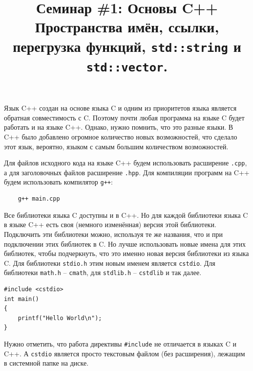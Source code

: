 \documentclass{article}
\begin{document}


\title{Семинар \#1: Основы C++ \\[1ex] \large Пространства имён, ссылки, перегрузка функций, \texttt{std::string} и \texttt{std::vector}. \vspace{-5ex}}\date{}\maketitle

Язык C++ создан на основе языка C и одним из приоритетов языка является обратная совместимость с C. Поэтому почти любая программа на языке C будет работать и на языке C++.
Однако, нужно помнить, что это разные языки. В C++ было добавлено огромное количество новых возможностей, что сделало этот язык, вероятно, языком с самым большим количеством возможностей.

Для файлов исходного кода на языке C++ будем использовать расширение \texttt{.cpp}, а для заголовочных файлов расширение \texttt{.hpp}. Для компиляции программ на C++ будем использовать компилятор \texttt{g++}:
\begin{verbatim}
    g++ main.cpp
\end{verbatim}
Все библиотеки языка C доступны и в C++. Но для каждой библиотеки языка C в языке C++ есть своя (немного изменённая) версия этой библиотеки. Подключить эти библиотеки можно, используя те же названия, что и при подключении этих библиотек в C.
Но лучше использовать новые имена для этих библиотек, чтобы подчеркнуть, что это именно новая версия библиотеки из языка C. Для библиотеки \texttt{stdio.h} этим новым именем является \texttt{cstdio}. Для библиотеки \texttt{math.h} -- \texttt{cmath}, для \texttt{stdlib.h} -- \texttt{cstdlib} и так далее.
\begin{lstlisting}
#include <cstdio>
int main() 
{
    printf("Hello World\n");
}
\end{lstlisting}
Нужно отметить, что работа директивы \texttt{\#include} не отличается в языках C и C++. А \texttt{cstdio} является просто текстовым файлом (без расширения), лежащим в системной папке на диске.
\end{document}
